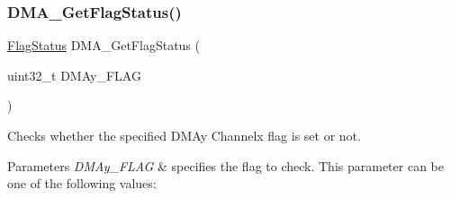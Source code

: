 \subsubsection{\texorpdfstring{DMA\_GetFlagStatus()}{DMA\_GetFlagStatus()}}
{\footnotesize\ttfamily \mbox{\hyperlink{group___exported__types_ga89136caac2e14c55151f527ac02daaff}{Flag\+Status}} D\+M\+A\+\_\+\+Get\+Flag\+Status (\begin{DoxyParamCaption}\item[{uint32\+\_\+t}]{D\+M\+Ay\+\_\+\+F\+L\+AG }\end{DoxyParamCaption})}



Checks whether the specified D\+M\+Ay Channelx flag is set or not. 


\begin{DoxyParams}{Parameters}
{\em D\+M\+Ay\+\_\+\+F\+L\+AG} & specifies the flag to check. This parameter can be one of the following values\+: \begin{DoxyItemize}

\end{DoxyItemize}
\end{DoxyParams}
